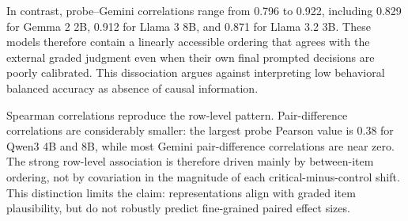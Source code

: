\begin{table}[t]
\centering
\scriptsize
{}
\caption{Row-level Pearson correlations, shown as estimate $\pm$ half-width of the pair-clustered 95\% bootstrap interval. Y/N and Likert targets are item-level order averages.}
\label{tab:rq3-pearson}
\end{table}

In contrast, probe--Gemini correlations range from 0.796 to 0.922, including 0.829 for Gemma 2 2B, 0.912 for Llama 3 8B, and 0.871 for Llama 3.2 3B. These models therefore contain a linearly accessible ordering that agrees with the external graded judgment even when their own final prompted decisions are poorly calibrated. This dissociation argues against interpreting low behavioral balanced accuracy as absence of causal information.

Spearman correlations reproduce the row-level pattern. Pair-difference correlations are considerably smaller: the largest probe Pearson value is 0.38 for Qwen3 4B and 8B, while most Gemini pair-difference correlations are near zero. The strong row-level association is therefore driven mainly by between-item ordering, not by covariation in the magnitude of each critical-minus-control shift. This distinction limits the claim: representations align with graded item plausibility, but do not robustly predict fine-grained paired effect sizes.

